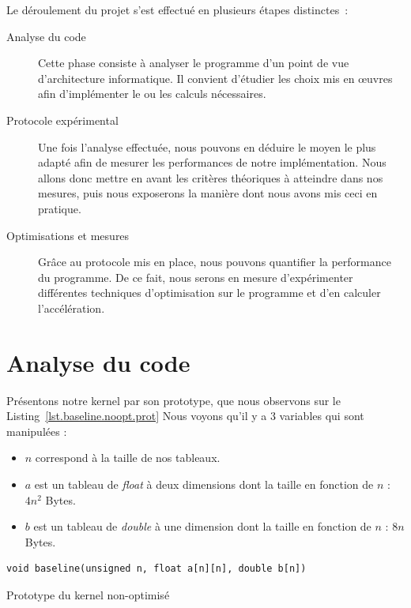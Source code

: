 \documentclass[12pt,a4paper]{article}
\begin{document}
Le déroulement du projet s'est effectué en plusieurs étapes distinctes :
\begin{description}
    \item[Analyse du code] Cette phase consiste à analyser le programme d'un
        point de vue d'architecture informatique. Il convient d'étudier les
        choix mis en œuvres afin d'implémenter le ou les calculs nécessaires.
    \item[Protocole expérimental] Une fois l'analyse effectuée, nous
        pouvons en déduire le moyen le plus adapté afin de mesurer les
        performances de notre implémentation. Nous allons donc mettre en
        avant les critères théoriques à atteindre dans nos mesures, puis
        nous exposerons la manière dont nous avons mis ceci en pratique.
    \item[Optimisations et mesures] Grâce au protocole mis en place, nous
        pouvons quantifier la performance du programme. De ce fait, nous serons
        en mesure d'expérimenter différentes techniques d'optimisation sur le
        programme et d'en calculer l'accélération.
\end{description}

\section{Analyse du code}

Présentons notre kernel par son prototype, que nous observons sur le
Listing~\ref{lst.baseline.noopt.prot} Nous voyons qu’il y a 3 variables qui sont manipulées :
\begin{itemize}
    \item $n$ correspond à la taille de nos tableaux.
    \item $a$ est un tableau de \textit{float} à deux dimensions dont la taille
        en fonction de $n$ : $4n^2$ Bytes.
    \item $b$ est un tableau de \textit{double} à une dimension dont la taille
        en fonction de $n$ : $8n$ Bytes.
\end{itemize}

\begin{listing}[h]
    \begin{verbatim}
void baseline(unsigned n, float a[n][n], double b[n])
    \end{verbatim}
    \caption{Prototype du kernel non-optimisé}
    \label{lst.baseline.noopt.prot}
\end{listing}
\end{document}
